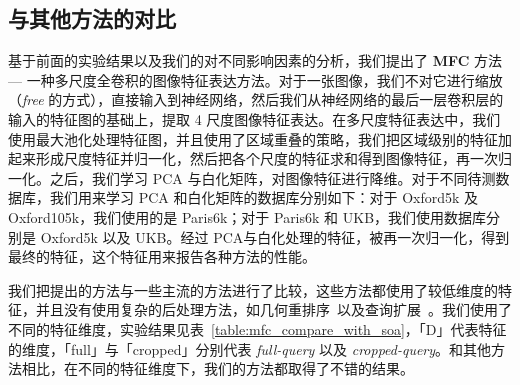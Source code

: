 \subsection{与其他方法的对比} \label{subsec:mfc_compare_soa}
基于前面的实验结果以及我们的对不同影响因素的分析，我们提出了 \textbf{MFC} 方法 --- 一种多尺度全卷积的图像特征表达方法。对于一张图像，我们不对它进行缩放（\emph{free} 的方式），直接输入到神经网络，然后我们从神经网络的最后一层卷积层的输入的特征图的基础上，提取 4 尺度图像特征表达。在多尺度特征表达中，我们使用最大池化处理特征图，并且使用了区域重叠的策略，我们把区域级别的特征加起来形成尺度特征并归一化，然后把各个尺度的特征求和得到图像特征，再一次归一化。之后，我们学习 PCA 与白化矩阵，对图像特征进行降维。对于不同待测数据库，我们用来学习 PCA 和白化矩阵的数据库分别如下：对于 Oxford5k 及 Oxford105k，我们使用的是 Paris6k；对于 Paris6k 和 UKB，我们使用数据库分别是 Oxford5k 以及 UKB。经过 PCA与白化处理的特征，被再一次归一化，得到最终的特征，这个特征用来报告各种方法的性能。

我们把提出的方法与一些主流的方法进行了比较，这些方法都使用了较低维度的特征，并且没有使用复杂的后处理方法，如几何重排序~\cite{Philbin2007ObjectRW}以及查询扩展~\cite{Chum2007TotalRA}。我们使用了不同的特征维度，实验结果见表~\ref{table:mfc_compare_with_soa}，「D」代表特征的维度，「full」与「cropped」分别代表 \emph{full-query} 以及 \emph{cropped-query}。和其他方法相比，在不同的特征维度下，我们的方法都取得了不错的结果。

